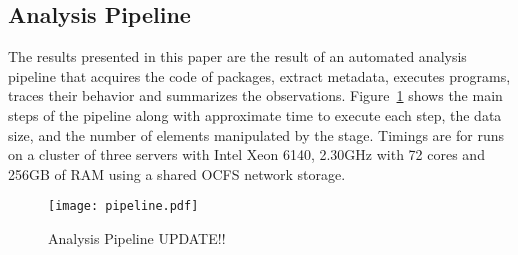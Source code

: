 \documentclass[acmsmall]{acmart}
\begin{document}
\subsection{Analysis Pipeline}

The results presented in this paper are the result of an automated analysis
pipeline that acquires the code of packages, extract metadata, executes
programs, traces their behavior and summarizes the observations.
Figure~\ref{fig:pipeline} shows the main steps of the pipeline along with
approximate time to execute each step, the data size, and the number of elements
manipulated by the stage. Timings are for runs on a cluster of three servers
with Intel Xeon 6140, 2.30GHz with 72 cores and 256GB of RAM using a shared OCFS
network storage.

\begin{figure}[!h]\hspace{-5mm}
  \texttt{[image: pipeline.pdf]}
  \caption{Analysis Pipeline UPDATE!!}\label{fig:pipeline}
\end{figure}
\end{document}
